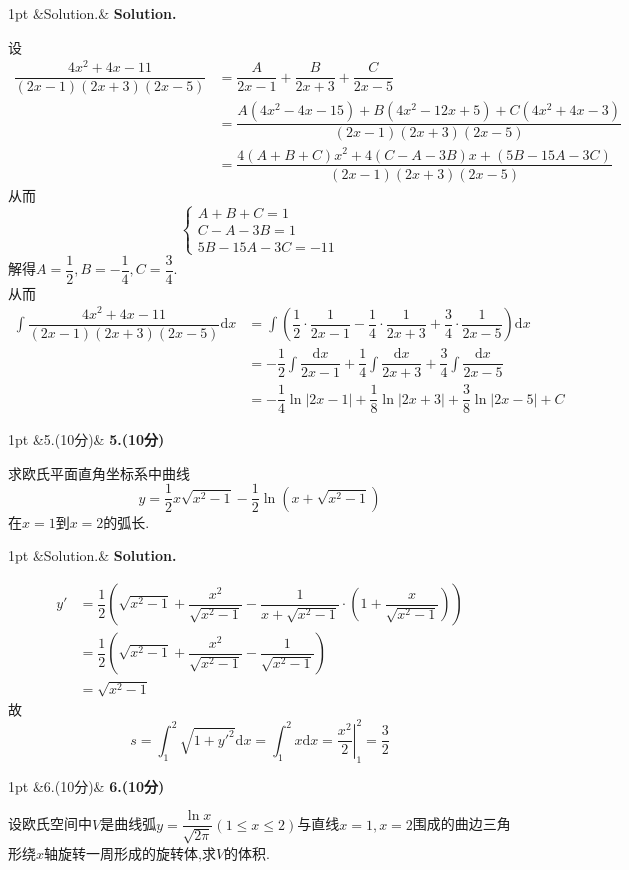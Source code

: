 \documentclass{ctexart}
\newcommand{\di}{\mathrm{d}}
\newcommand{\dx}{\di x}
\newenvironment{solution}[1][]{%
\def\FrameCommand{%
\hspace{1pt}%
{\color{solutionline}\vrule width 2pt}%
{\color{solutionshade}\vrule width 4pt}%
\colorbox{solutionshade}%
}%
\MakeFramed{\advance\hsize-\width\FrameRestore}%
\noindent\hspace{-4.55pt}%
\begin{adjustwidth}{}{1pt}%
\setlength{\parindent}{0pt}%
\vspace{3pt}%
\ifx&#1&\else %
    \textbf{#1}\par\vspace{1pt}%
\fi
}
{%
\vspace{2pt}%
\end{adjustwidth}\endMakeFramed%
}
\newenvironment{problem}[1][]{%
\def\FrameCommand{%
\hspace{1pt}%
{\color{problemline}\vrule width 2pt}%
{\color{problemshade}\vrule width 4pt}%
\colorbox{problemshade}%
}%
\MakeFramed{\advance\hsize-\width\FrameRestore}%
\noindent\hspace{-4.55pt}%
\begin{adjustwidth}{}{1pt}%
\setlength{\parindent}{0pt}%
\vspace{3pt}%
\ifx&#1&\else %
    \textbf{#1}\par\vspace{1pt}%
\fi
}
{%
\vspace{2pt}%
\end{adjustwidth}\endMakeFramed%
}
\begin{document}
\begin{solution}[Solution.]
    设
    \begin{align*}
        \dfrac{4x^2+4x-11}{(2x-1)(2x+3)(2x-5)}
        &= \dfrac{A}{2x-1}+\dfrac{B}{2x+3}+\dfrac{C}{2x-5} \\
        &= \dfrac{A(4x^2-4x-15)+B(4x^2-12x+5)+C(4x^2+4x-3)}{(2x-1)(2x+3)(2x-5)} \\
        &= \dfrac{4(A+B+C)x^2+4(C-A-3B)x+(5B-15A-3C)}{(2x-1)(2x+3)(2x-5)}
    \end{align*}
    从而$$\left\{\begin{array}{l}
        A+B+C=1 \\
        C-A-3B=1 \\
        5B-15A-3C=-11
    \end{array}\right.$$
    解得$A=\dfrac{1}{2},B=-\dfrac{1}{4},C=\dfrac{3}{4}$.\\
    从而\begin{align*}
        \int{\dfrac{4x^2+4x-11}{(2x-1)(2x+3)(2x-5)}\dx}
        &= \int\left(\dfrac{1}{2}\cdot\dfrac{1}{2x-1}-\dfrac{1}{4}\cdot\dfrac{1}{2x+3}+\dfrac{3}{4}\cdot\dfrac{1}{2x-5}\right)\dx\\
        &= -\dfrac{1}{2}\int{\dfrac{\dx}{2x-1}}+\dfrac{1}{4}\int{\dfrac{\dx}{2x+3}}+\dfrac{3}{4}\int{\dfrac{\dx}{2x-5}} \\
        &= -\dfrac{1}{4}\ln{\left|2x-1\right|}+\dfrac{1}{8}\ln{\left|2x+3\right|}+\dfrac{3}{8}\ln{\left|2x-5\right|}+C
    \end{align*}
\end{solution}
\begin{problem}[5.(10分)]
    求欧氏平面直角坐标系中曲线$$y=\dfrac{1}{2}x\sqrt{x^2-1}-\dfrac{1}{2}\ln{\left(x+\sqrt{x^2-1}\right)}$$在$x=1$到$x=2$的弧长.
\end{problem}
\begin{solution}[Solution.]
    \begin{align*}
        y'
        &= \dfrac{1}{2}\left(\sqrt{x^2-1}+\dfrac{x^2}{\sqrt{x^2-1}}-\dfrac{1}{x+\sqrt{x^2-1}}\cdot\left(1+\dfrac{x}{\sqrt{x^2-1}}\right)\right) \\
        &= \dfrac{1}{2}\left(\sqrt{x^2-1}+\dfrac{x^2}{\sqrt{x^2-1}}-\dfrac{1}{\sqrt{x^2-1}}\right) \\
        &= \sqrt{x^2-1}
    \end{align*}
    故$$s=\int_{1}^{2}{\sqrt{1+y'^2}\dx}=\int_{1}^{2}{x\dx}=\left.\dfrac{x^2}{2}\right|_1^2=\dfrac{3}{2}$$
\end{solution}
\begin{problem}[6.(10分)]
    设欧氏空间中$V$是曲线弧$\displaystyle y=\dfrac{\ln{x}}{\sqrt{2\pi}}(1\leqslant x\leqslant 2)$与直线$x=1,x=2$围成的曲边三角形绕$x$轴旋转一周形成的旋转体,求$V$的体积.
\end{problem}
\end{document}

